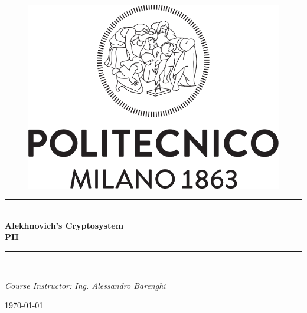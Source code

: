 \documentclass[12pt, letterpaper, oneside]{report}
\begin{document}
\begin{titlepage}

\newcommand{\HRule}{\rule{\linewidth}{0.5mm}}

\center 
\begin{figure}[h]
\centerline{\includegraphics[scale=0.4]{img/logo.png}}

\label{logo}
\end{figure}



\vspace{2.0cm}
\HRule \\[0.8cm]
{ \huge \bfseries Alekhnovich's Cryptosystem}\\[0.4cm] %
{ \large \bfseries PII}\\[0.2cm]
\HRule \\[1.5cm]
 

\begin{minipage}{0.8\textwidth}

\begin{center} \large
\emph{Course Instructor: Ing. Alessandro Barenghi}
\end{center}

\begin{center}
\today
\end{center}

\end{minipage}


\end{titlepage}


\newpage

\tableofcontents


\newpage

\newpage




\end{document}

